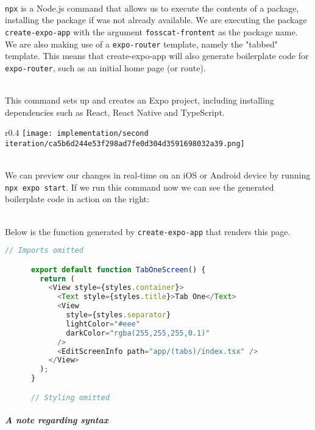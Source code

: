 \documentclass[../../main.tex]{subfiles}
\begin{document}
\noindent \\ \lstinline{npx} is a Node.js command that allows us to execute the contents of a package,
installing the package if was not already available. We are executing the package \lstinline{create-expo-app}
with the argument \lstinline{fosscat-frontent} as the package name.
We are also making use of a \lstinline{expo-router} template, namely the "tabbed" template.
This means that create-expo-app will also generate boilerplate code for \lstinline{expo-router},
such as an initial home page (or route).

\noindent \\ This command sets up and creates an Expo project, including installing dependencies such as
React, React Native and TypeScript.

\begin{dummyenv}

  \begin{wrapfigure}{r}{0.4\textwidth}
    \texttt{[image: implementation/second iteration/ca5b6d244e53f298ad7fe0d304d3591698032a39.png]}
    \label{fig:wrapfig}
  \end{wrapfigure}

  \noindent \\ We can preview our changes in real-time on an iOS or Android device by running \lstinline{npx expo start}.
  If we run this command now we can see the generated boilerplate code in action on the right:

  \noindent \\ Below is the function generated by
  \lstinline{create-expo-app} that renders this page.

  \begin{lstlisting}[language=typescript, breaklines=false]
      // Imports omitted

      export default function TabOneScreen() {
        return (
          <View style={styles.container}>
            <Text style={styles.title}>Tab One</Text>
            <View
              style={styles.separator}
              lightColor="#eee"
              darkColor="rgba(255,255,255,0.1)"
            />
            <EditScreenInfo path="app/(tabs)/index.tsx" />
          </View>
        );
      }

      // Styling omitted
    \end{lstlisting}

\end{dummyenv}

\subparagraph{A note regarding syntax\\}
\end{document}
